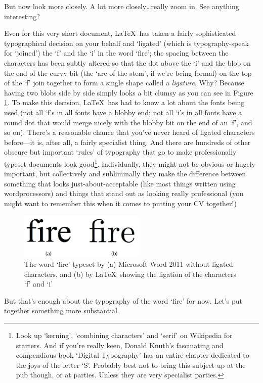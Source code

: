 But now look more closely. A lot more closely\ldots really zoom in. See anything interesting?

Even for this very short document, \LaTeX\ has taken a fairly sophisticated typographical decision on your behalf and `ligated' (which is typo\-graphy-speak for `joined') the `f' and the `i' in the word `fire'; the spacing between the characters has been subtly altered so that the dot above the `i' and the blob on the end of the curvy bit (the `arc of the stem', if we're being formal) on the top of the `f' join together to form a single shape called a \emph{ligature}. Why? Because having two blobs side by side simply looks a bit clumsy as you can see in Figure \ref{figure:twofires}. To make this decision, \LaTeX\ has had to know a lot about the fonts being used (not all `f's in all fonts have a blobby end; not all `i's in all fonts have a round dot that would merge nicely with the blobby bit on the end of an `f', and so on). There's a reasonable chance that you've never heard of ligated characters before---it is, after all, a fairly specialist thing. And there are hundreds of other obscure but important `rules' of typography that go to make professionally typeset documents look good\footnote{Look up `kerning', `combining characters' and `serif' on Wikipedia for starters. And if you're really keen, Donald Knuth's fascinating and compendious book `Digital Typography' \citep{knuth1999} has an entire chapter dedicated to the joys of the letter `S'. Probably best not to bring this subject up at the pub though, or at parties. Unless they are very specialist parties.}. Individually, they might not be obvious or hugely important, but collectively and subliminally they make the difference between something that looks just-about-acceptable (like most things written using wordprocessors) and things that stand out as looking really professional (you might want to remember this when it comes to putting your CV together!)

\begin{figure}[htbp]
\centerline{\includegraphics[width=6cm]{images/fireandfire.png}}
\caption{The word `fire' typeset by (a) Microsoft Word 2011 without ligated characters, and (b) by \LaTeX\ showing the ligation of the characters `f' and `i'}\label{figure:twofires}
\end{figure}
%
But that's enough about the typography of the word `fire' for now. Let's put together something more substantial. 

